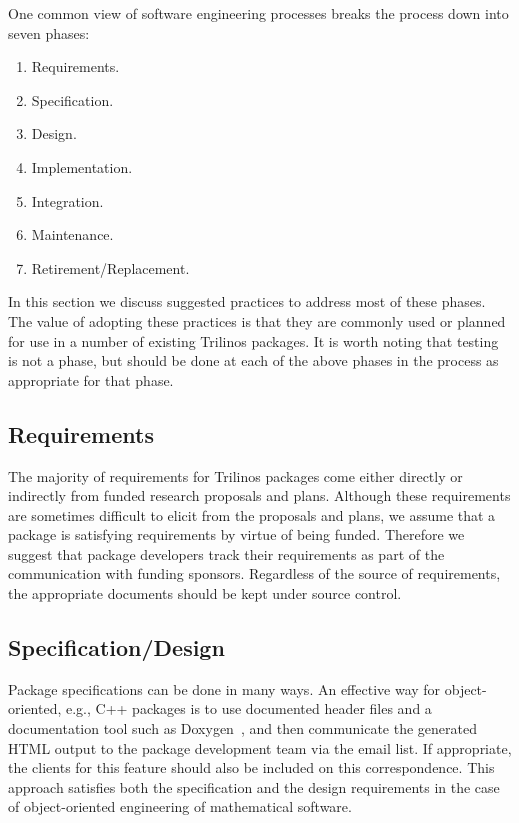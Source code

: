 \documentclass[12pt,relax]{TrilinosDevGuide}
\begin{document}
One common view of software engineering processes breaks the process down into 
seven phases:
\begin{enumerate}
\item Requirements.
\item Specification.
\item Design.
\item Implementation.
\item Integration.
\item Maintenance.
\item Retirement/Replacement.
\end{enumerate}
In this section we discuss suggested practices to address most of these 
phases.  The value of adopting these practices is that they are commonly used 
or planned for use in a number of existing Trilinos packages.  It is worth 
noting that testing is not a phase, but should be done at each of the above 
phases in the process as appropriate for that phase.

\subsection{Requirements}
The majority of requirements for Trilinos packages come either directly or 
indirectly from funded research proposals and plans.  Although these 
requirements are sometimes difficult to elicit from the proposals and plans, 
we assume that a package is satisfying requirements by virtue of being 
funded.  Therefore we suggest that package developers track their 
requirements as part of the communication with funding sponsors.
Regardless of the source of requirements, the appropriate documents
should be kept under source control.

\subsection{Specification/Design}
Package specifications can be done in many ways.  An effective way for 
object-oriented, e.g., C++ packages is to use documented header files and a 
documentation tool such as Doxygen~\cite{Doxygen}, and then communicate the 
generated HTML output to the package development team via the 
 email list.  If
appropriate, the clients for this feature should also be included on
this correspondence.  This
approach satisfies both the specification and the design requirements
in the case of object-oriented engineering of mathematical software.
\end{document}
